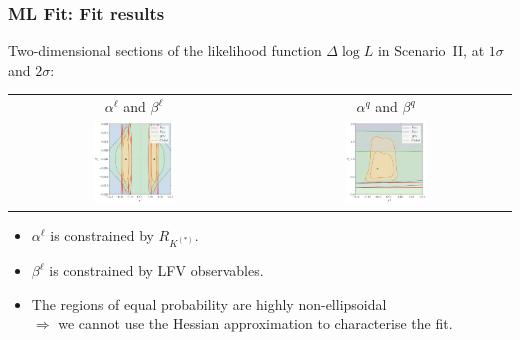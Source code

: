 \documentclass[mathserif, 10pt, dvipsnames]{beamer}
\begin{document}
\begin{frame}\frametitle{ML Fit: Fit results}
Two-dimensional sections of the
likelihood function $\Delta \log L$ in Scenario~II, at $1 \sigma$ and
$2 \sigma$:
    \begin{center}
        \begin{tabular}{cc}
{\small $\alpha^\ell$ and $\beta^\ell$}                         & {\small $\alpha^q$ and $\beta^q$}                               \\
\includegraphics[width=0.34\textwidth]{figures/alphabeta_l.pdf} & \includegraphics[width=0.34\textwidth]{figures/alphabeta_q.pdf}
        \end{tabular}
    \end{center}
    \begin{itemize}
        \item $\alpha^\ell$ is constrained by $R_{K^{(*)}}$.
        \item $\beta^\ell$ is constrained by LFV observables.
\item The regions of
equal probability are highly non-ellipsoidal\\
$\Rightarrow$ we cannot use
the Hessian approximation to characterise the fit.
\end{itemize}

\end{frame}
\end{document}
